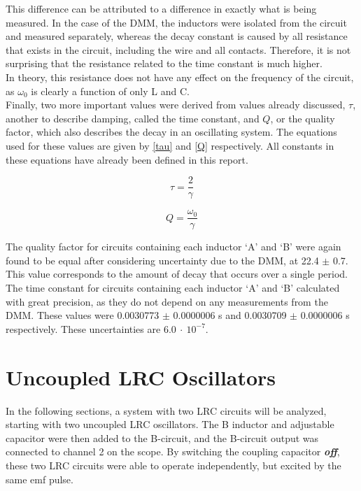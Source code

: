 \documentclass[aps,prl,reprint]{revtex4-2}
\begin{document}
This difference can be attributed to a difference in exactly what 
is being measured. In the case of the DMM, the inductors were isolated
from the circuit and measured separately, whereas the decay constant 
is caused by all resistance that exists in the circuit, including the
wire and all contacts. Therefore, it is not surprising that the
resistance related to the time constant is much higher. \\

In theory, this resistance does not have any effect on the frequency
of the circuit, as $\omega_0$ is clearly a function of only L and C. \\

Finally, two more important values were derived from values already
discussed, $\tau$, another to describe damping, called the time constant,
and $Q$, or the quality factor, which also describes the decay
in an oscillating system. The equations used for these values are given
by \ref{tau} and \ref{Q} respectively.
All constants in these equations have already been defined in this report.

\begin{equation} 
	\tau = \frac{2}{\gamma}
	\label{tau}
\end{equation}

\begin{equation} 
	Q = \frac{\omega_0}{\gamma}
	\label{Q}
\end{equation}

The quality factor for circuits containing each inductor `A' and `B' were
again found to be equal after considering uncertainty due to the DMM,
at 22.4 $\pm$ 0.7. This value corresponds to the amount of decay that
occurs over a single period. \\

The time constant for circuits containing each inductor `A' and `B' 
calculated with great precision, as they do not depend on any measurements
from the DMM. These values were 0.0030773 $\pm$ 0.0000006 s and 
0.0030709 $\pm$ 0.0000006 s respectively. These uncertainties are 
$6.0\ \cdot\ 10^{-7}$.

\newpage
\section{Uncoupled LRC Oscillators}

In the following sections, a system with two LRC circuits will be
analyzed, starting with two uncoupled LRC oscillators.
The B inductor and adjustable capacitor were then added to the 
B-circuit, and the B-circuit output was connected to channel
2 on the scope. By switching the coupling capacitor 
\textbf{\emph{off}}, these two LRC circuits were able to operate
independently, but excited by the same emf pulse.\\
\end{document}
